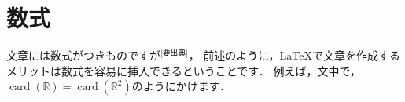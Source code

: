 \section{数式}
  文章には数式がつきものですが$^\text{[要出典]}$，
  前述のように，\LaTeX で文章を作成するメリットは数式を容易に挿入できるということです．
  例えば，文中で，
  $\operatorname{card}(\mathbb{R}) = \operatorname{card}(\mathbb{R}^2)$のようにかけます．
